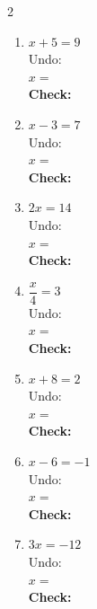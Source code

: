 \documentclass[12pt]{article}
\newcommand{\wspm}{\vspace{2.0cm}}
\newcommand{\sblank}{\underline{\hspace{1.4cm}}}
\begin{document}
\begin{multicols}{2}
\begin{enumerate}[label=\textbf{\arabic*.}, itemsep=0pt]

  \item $x + 5 = 9$\\[3pt]
  Undo: \sblank\\[3pt]
  $x = $ \sblank\\[3pt]
  \textbf{Check:} \underline{\hspace{3.2cm}}
  \wspm

  \item $x - 3 = 7$\\[3pt]
  Undo: \sblank\\[3pt]
  $x = $ \sblank\\[3pt]
  \textbf{Check:} \underline{\hspace{3.2cm}}
  \wspm

  \item $2x = 14$\\[3pt]
  Undo: \sblank\\[3pt]
  $x = $ \sblank\\[3pt]
  \textbf{Check:} \underline{\hspace{3.2cm}}
  \wspm

  \item $\dfrac{x}{4} = 3$\\[6pt]
  Undo: \sblank\\[3pt]
  $x = $ \sblank\\[3pt]
  \textbf{Check:} \underline{\hspace{3.2cm}}
  \wspm

  \item $x + 8 = 2$\\[3pt]
  Undo: \sblank\\[3pt]
  $x = $ \sblank\\[3pt]
  \textbf{Check:} \underline{\hspace{3.2cm}}
  \wspm

  \item $x - 6 = -1$\\[3pt]
  Undo: \sblank\\[3pt]
  $x = $ \sblank\\[3pt]
  \textbf{Check:} \underline{\hspace{3.2cm}}
  \wspm

  \item $3x = -12$\\[3pt]
  Undo: \sblank\\[3pt]
  $x = $ \sblank\\[3pt]
  \textbf{Check:} \underline{\hspace{3.2cm}}
  \wspm


\end{enumerate}
\end{multicols}
\end{document}
